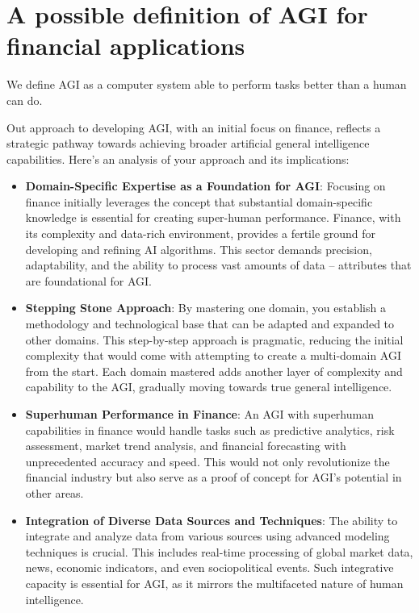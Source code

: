\documentclass[11pt, reqno]{amsart}
\theoremstyle{definition}
\theoremstyle{remark}
\begin{document}
	\section{A possible definition of AGI for financial applications}

	We define AGI as a computer system able to perform tasks better than a
	human can do.

	Out approach to developing AGI, with an initial focus on finance,
	reflects a strategic pathway towards achieving broader artificial general
	intelligence capabilities. Here's an analysis of your approach and its implications:

	\begin{itemize}
		\item \textbf{Domain-Specific Expertise as a Foundation for AGI}: Focusing
			on finance initially leverages the concept that substantial domain-specific
			knowledge is essential for creating super-human performance. Finance,
			with its complexity and data-rich environment, provides a fertile
			ground for developing and refining AI algorithms. This sector demands
			precision, adaptability, and the ability to process vast amounts of data
			– attributes that are foundational for AGI.

		\item \textbf{Stepping Stone Approach}: By mastering one domain, you
			establish a methodology and technological base that can be adapted
			and expanded to other domains. This step-by-step approach is pragmatic,
			reducing the initial complexity that would come with attempting to
			create a multi-domain AGI from the start. Each domain mastered adds another
			layer of complexity and capability to the AGI, gradually moving
			towards true general intelligence.

		\item \textbf{Superhuman Performance in Finance}: An AGI with superhuman
			capabilities in finance would handle tasks such as predictive analytics,
			risk assessment, market trend analysis, and financial forecasting
			with unprecedented accuracy and speed. This would not only revolutionize
			the financial industry but also serve as a proof of concept for AGI's
			potential in other areas.

		\item \textbf{Integration of Diverse Data Sources and Techniques}: The ability
			to integrate and analyze data from various sources using advanced modeling
			techniques is crucial. This includes real-time processing of global
			market data, news, economic indicators, and even sociopolitical events.
			Such integrative capacity is essential for AGI, as it mirrors the multifaceted
			nature of human intelligence.


\end{itemize}
\end{document}
